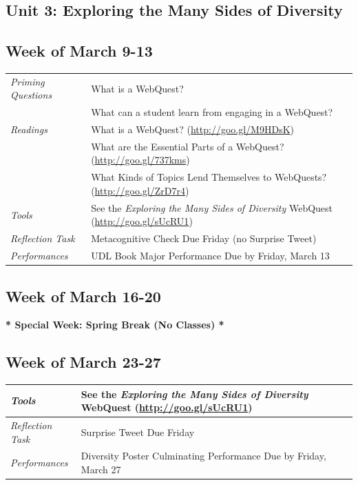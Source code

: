\documentclass{tufte-handout}
\newcommand{\tabpq}{\faQuestionSign\medspace\textit{Priming Questions}}
\newcommand{\tabread}{\faBook\medspace\textit{Readings}}
\newcommand{\tabtools}{\faWrench\medspace\textit{Tools}}
\newcommand{\tabtweet}{\faLightbulb\medspace\textit{Reflection Task} & Surprise Tweet Due Friday \\}
\newcommand{\tabcheck}{\faLightbulb\medspace\textit{Reflection Task} & Metacognitive Check Due Friday (no Surprise Tweet) \\}
\newcommand{\tabperformance}{\faTasks\medspace\textit{Performances}}
\newenvironment{tabsched}
	{\small
	\begin{tabular}{p{1.5in}p{5in}}
	\toprule}
	{\bottomrule
	\end{tabular}
	\normalsize}
\begin{document}
\begin{fullwidth}
\section{Unit 3: Exploring the Many Sides of Diversity}

\subsection{Week of March 9-13}

\begin{tabsched}
	\tabpq & What is a WebQuest? \\
	& What can a student learn from engaging in a WebQuest? \\
	\midrule
	\tabread &  What is a WebQuest? (\url{http://goo.gl/M9HDsK}) \\
	& What are the Essential Parts of a WebQuest? (\url{http://goo.gl/737kms}) \\
	& What Kinds of Topics Lend Themselves to WebQuests? (\url{http://goo.gl/ZrD7r4}) \\
	\midrule
	\tabtools & See the \textit{Exploring the Many Sides of Diversity} WebQuest (\url{http://goo.gl/sUcRU1}) \\
	\midrule
	\tabcheck
	\midrule
	\tabperformance & UDL Book Major Performance Due by Friday, March 13 \\
\end{tabsched}

\subsection{Week of March 16-20}

\begin{center}
	\textbf{* Special Week: Spring Break (No Classes) *}
\end{center}

\subsection{Week of March 23-27}

\begin{tabsched}
	\tabtools & See the \textit{Exploring the Many Sides of Diversity} WebQuest (\url{http://goo.gl/sUcRU1}) \\
	\midrule
	\tabtweet
	\midrule
	\tabperformance & Diversity Poster Culminating Performance Due by Friday, March 27 \\
\end{tabsched}


\end{fullwidth}
\end{document}
